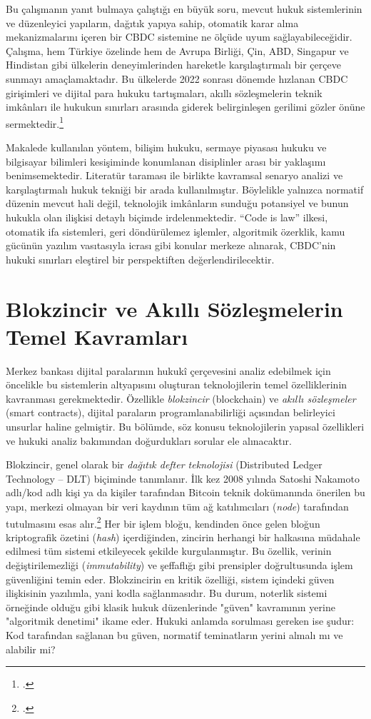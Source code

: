 \documentclass[a4paper,12pt]{article}
\begin{document}
Bu çalışmanın yanıt bulmaya çalıştığı en büyük soru, mevcut hukuk sistemlerinin ve düzenleyici yapıların, dağıtık yapıya sahip, otomatik karar alma mekanizmalarını içeren bir CBDC sistemine ne ölçüde uyum sağlayabileceğidir. Çalışma, hem Türkiye özelinde hem de Avrupa Birliği, Çin, ABD, Singapur ve Hindistan gibi ülkelerin deneyimlerinden hareketle karşılaştırmalı bir çerçeve sunmayı amaçlamaktadır. Bu ülkelerde 2022 sonrası dönemde hızlanan CBDC girişimleri ve dijital para hukuku tartışmaları, akıllı sözleşmelerin teknik imkânları ile hukukun sınırları arasında giderek belirginleşen gerilimi gözler önüne sermektedir.\footcite{orchid2023project}

Makalede kullanılan yöntem, bilişim hukuku, sermaye piyasası hukuku ve bilgisayar bilimleri kesişiminde konumlanan disiplinler arası bir yaklaşımı benimsemektedir. Literatür taraması ile birlikte kavramsal senaryo analizi ve karşılaştırmalı hukuk tekniği bir arada kullanılmıştır. Böylelikle yalnızca normatif düzenin mevcut hali değil, teknolojik imkânların sunduğu potansiyel ve bunun hukukla olan ilişkisi detaylı biçimde irdelenmektedir. “Code is law” ilkesi, otomatik ifa sistemleri, geri döndürülemez işlemler, algoritmik özerklik, kamu gücünün yazılım vasıtasıyla icrası gibi konular merkeze alınarak, CBDC'nin hukuki sınırları eleştirel bir perspektiften değerlendirilecektir.


\section{Blokzincir ve Akıllı Sözleşmelerin Temel Kavramları}

Merkez bankası dijital paralarının hukukî çerçevesini analiz edebilmek için öncelikle bu sistemlerin altyapısını oluşturan teknolojilerin temel özelliklerinin kavranması gerekmektedir. Özellikle \textit{blokzincir} (blockchain) ve \textit{akıllı sözleşmeler} (smart contracts), dijital paraların programlanabilirliği açısından belirleyici unsurlar haline gelmiştir. Bu bölümde, söz konusu teknolojilerin yapısal özellikleri ve hukuki analiz bakımından doğurdukları sorular ele alınacaktır.

Blokzincir, genel olarak bir \textit{dağıtık defter teknolojisi} (Distributed Ledger Technology – DLT) biçiminde tanımlanır. İlk kez 2008 yılında Satoshi Nakamoto adlı/kod adlı kişi ya da kişiler tarafından Bitcoin teknik dokümanında önerilen bu yapı, merkezi olmayan bir veri kaydının tüm ağ katılımcıları (\textit{node}) tarafından tutulmasını esas alır.\footcite{nakamoto2008bitcoin} Her bir işlem bloğu, kendinden önce gelen bloğun kriptografik özetini (\textit{hash}) içerdiğinden, zincirin herhangi bir halkasına müdahale edilmesi tüm sistemi etkileyecek şekilde kurgulanmıştır. Bu özellik, verinin değiştirilemezliği (\textit{immutability}) ve şeffaflığı gibi prensipler doğrultusunda işlem güvenliğini temin eder. Blokzincirin en kritik özelliği, sistem içindeki güven ilişkisinin yazılımla, yani kodla sağlanmasıdır. Bu durum, noterlik sistemi örneğinde olduğu gibi klasik hukuk düzenlerinde "güven" kavramının yerine "algoritmik denetimi" ikame eder. Hukuki anlamda sorulması gereken ise şudur: Kod tarafından sağlanan bu güven, normatif teminatların yerini almalı mı ve alabilir mi?
\end{document}

